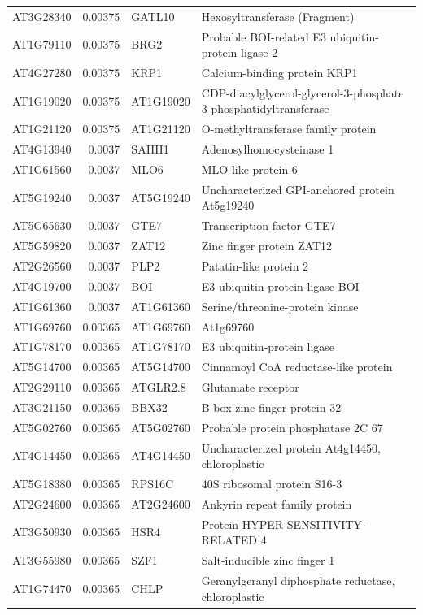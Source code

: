 \documentclass[11pt]{article}
\begin{document}
\begin{center}
\begin{tabular}{lrll}
AT3G28340 & 0.00375 & GATL10 & Hexosyltransferase (Fragment)\\
AT1G79110 & 0.00375 & BRG2 & Probable BOI-related E3 ubiquitin-protein ligase 2\\
AT4G27280 & 0.00375 & KRP1 & Calcium-binding protein KRP1\\
AT1G19020 & 0.00375 & AT1G19020 & CDP-diacylglycerol-glycerol-3-phosphate 3-phosphatidyltransferase\\
AT1G21120 & 0.00375 & AT1G21120 & O-methyltransferase family protein\\
AT4G13940 & 0.0037 & SAHH1 & Adenosylhomocysteinase 1\\
AT1G61560 & 0.0037 & MLO6 & MLO-like protein 6\\
AT5G19240 & 0.0037 & AT5G19240 & Uncharacterized GPI-anchored protein At5g19240\\
AT5G65630 & 0.0037 & GTE7 & Transcription factor GTE7\\
AT5G59820 & 0.0037 & ZAT12 & Zinc finger protein ZAT12\\
AT2G26560 & 0.0037 & PLP2 & Patatin-like protein 2\\
AT4G19700 & 0.0037 & BOI & E3 ubiquitin-protein ligase BOI\\
AT1G61360 & 0.0037 & AT1G61360 & Serine/threonine-protein kinase\\
AT1G69760 & 0.00365 & AT1G69760 & At1g69760\\
AT1G78170 & 0.00365 & AT1G78170 & E3 ubiquitin-protein ligase\\
AT5G14700 & 0.00365 & AT5G14700 & Cinnamoyl CoA reductase-like protein\\
AT2G29110 & 0.00365 & ATGLR2.8 & Glutamate receptor\\
AT3G21150 & 0.00365 & BBX32 & B-box zinc finger protein 32\\
AT5G02760 & 0.00365 & AT5G02760 & Probable protein phosphatase 2C 67\\
AT4G14450 & 0.00365 & AT4G14450 & Uncharacterized protein At4g14450, chloroplastic\\
AT5G18380 & 0.00365 & RPS16C & 40S ribosomal protein S16-3\\
AT2G24600 & 0.00365 & AT2G24600 & Ankyrin repeat family protein\\
AT3G50930 & 0.00365 & HSR4 & Protein HYPER-SENSITIVITY-RELATED 4\\
AT3G55980 & 0.00365 & SZF1 & Salt-inducible zinc finger 1\\
AT1G74470 & 0.00365 & CHLP & Geranylgeranyl diphosphate reductase, chloroplastic\\

\end{tabular}
\end{center}
\end{document}
